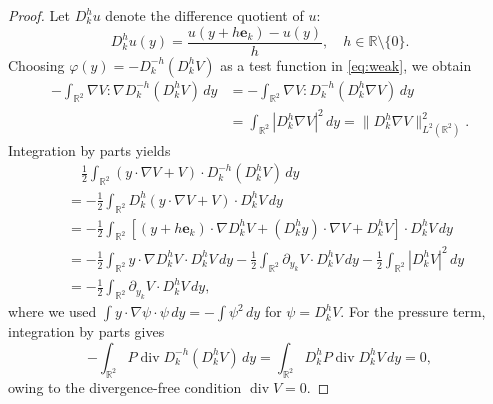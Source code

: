 \documentclass[12pt]{amsart}
\numberwithin{equation}{section}              %
\theoremstyle{remark}
\begin{document}
		\begin{proof}
			Let $D_{k}^{h}u$ denote the difference quotient of $u$:
			\begin{equation*}
				D_{k}^{h}u(y) = \frac{u(y + h\mathbf{e}_{k}) - u(y)}{h}, \quad h \in \mathbb{R} \setminus \{0\}.
			\end{equation*}
			Choosing $\varphi(y) = -D_{k}^{-h}(D_{k}^{h}V)$ as a test function in \eqref{eq:weak}, we obtain
			\begin{equation*}
				\begin{aligned}
					-\int_{\mathbb{R}^{2}} \nabla V : \nabla D_{k}^{-h}(D_{k}^{h}V) \, dy &= -\int_{\mathbb{R}^{2}} \nabla V : D_{k}^{-h}(D_{k}^{h}\nabla V) \, dy \\
					&= \int_{\mathbb{R}^{2}} |D_{k}^{h}\nabla V|^2 \, dy = \|D_{k}^{h}\nabla V\|_{L^{2}(\mathbb{R}^{2})}^{2}.
				\end{aligned}
			\end{equation*}
			Integration by parts yields
			\begin{equation*}
				\begin{aligned}
					&\quad \frac{1}{2} \int_{\mathbb{R}^{2}} (y \cdot \nabla V + V) \cdot D_{k}^{-h}(D_{k}^{h}V) \, dy \\
					&= -\frac{1}{2} \int_{\mathbb{R}^{2}} D_{k}^{h}(y \cdot \nabla V + V) \cdot D_{k}^{h}V \, dy \\
					&= -\frac{1}{2} \int_{\mathbb{R}^{2}} \left[ (y + h\mathbf{e}_{k}) \cdot \nabla D_{k}^{h}V + (D_{k}^{h}y) \cdot \nabla V + D_{k}^{h}V \right] \cdot D_{k}^{h}V \, dy \\
					&= -\frac{1}{2} \int_{\mathbb{R}^{2}} y \cdot \nabla D_{k}^{h}V \cdot D_{k}^{h}V \, dy - \frac{1}{2} \int_{\mathbb{R}^{2}} \partial_{y_{k}}V \cdot D_{k}^{h}V \, dy - \frac{1}{2} \int_{\mathbb{R}^{2}} |D_{k}^{h}V|^2 \, dy \\
					&= -\frac{1}{2} \int_{\mathbb{R}^{2}} \partial_{y_{k}}V \cdot D_{k}^{h}V \, dy,
				\end{aligned}
			\end{equation*}
			where we used $\int y \cdot \nabla \psi \cdot \psi \, dy = -\int \psi^2 \, dy$ for $\psi = D_k^h V$.
			For the pressure term, integration by parts gives
			\begin{equation*}
				-\int_{\mathbb{R}^{2}} P \operatorname{div} D_{k}^{-h}(D_{k}^{h}V) \, dy = \int_{\mathbb{R}^{2}} D_{k}^{h}P \operatorname{div} D_{k}^{h}V \, dy = 0,
			\end{equation*}
			owing to the divergence-free condition $\operatorname{div} V = 0$.

\end{proof}
\end{document}
